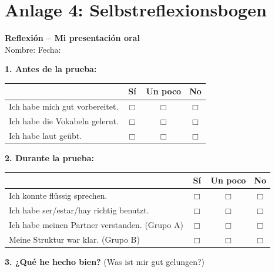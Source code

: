 \documentclass[11pt,a4paper]{article}
\begin{document}
\section*{Anlage 4: Selbstreflexionsbogen}

\begin{center}
\textbf{\large Reflexión -- Mi presentación oral}\\[0.5em]
Nombre: \underline{\hspace{5cm}} \hspace{1cm} Fecha: \underline{\hspace{3cm}}
\end{center}

\vspace{1em}

\textbf{1. Antes de la prueba:}

\begin{tabular}{|p{10cm}|c|c|c|}
\hline
& \textbf{Sí} & \textbf{Un poco} & \textbf{No} \\
\hline
Ich habe mich gut vorbereitet. & $\Box$ & $\Box$ & $\Box$ \\
\hline
Ich habe die Vokabeln gelernt. & $\Box$ & $\Box$ & $\Box$ \\
\hline
Ich habe laut geübt. & $\Box$ & $\Box$ & $\Box$ \\
\hline
\end{tabular}

\vspace{1em}

\textbf{2. Durante la prueba:}

\begin{tabular}{|p{10cm}|c|c|c|}
\hline
& \textbf{Sí} & \textbf{Un poco} & \textbf{No} \\
\hline
Ich konnte flüssig sprechen. & $\Box$ & $\Box$ & $\Box$ \\
\hline
Ich habe ser/estar/hay richtig benutzt. & $\Box$ & $\Box$ & $\Box$ \\
\hline
Ich habe meinen Partner verstanden. (Grupo A) & $\Box$ & $\Box$ & $\Box$ \\
\hline
Meine Struktur war klar. (Grupo B) & $\Box$ & $\Box$ & $\Box$ \\
\hline
\end{tabular}

\vspace{1em}

\textbf{3. ¿Qué he hecho bien?} (Was ist mir gut gelungen?)

\vspace{2cm}
\end{document}
